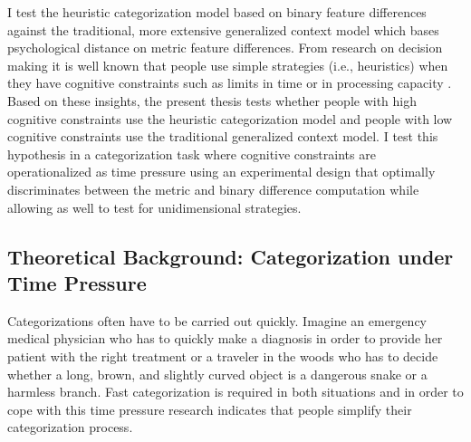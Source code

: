 \documentclass[a4paper,man,natbib]{apa6}
\begin{document}
I test the heuristic categorization model based on binary feature differences against the traditional, more extensive generalized context model \citep{nosofsky1986attention} which bases psychological distance on metric feature differences. From research on decision making it is well known that people use simple strategies (i.e., heuristics) when they have cognitive constraints such as limits in time or in processing capacity \citep{gigerenzer1996reasoning, finucane2000affect, kahneman2003perspective, gilovich2002heuristics, simon1957models, simon1955behavioral}. Based on these insights, the present thesis tests whether people with high cognitive constraints use the heuristic categorization model and people with low cognitive constraints use the traditional generalized context model. I test this hypothesis in a categorization task where cognitive constraints are operationalized as time pressure using an experimental design that optimally discriminates between the metric and binary difference computation while allowing as well to test for unidimensional strategies. 


\subsection{Theoretical Background: Categorization under Time Pressure}
Categorizations often have to be carried out quickly. Imagine an emergency medical physician who has to quickly make a diagnosis in order to provide her patient with the right treatment or a traveler in the woods who has to decide whether a long, brown, and slightly curved object is a dangerous snake or a harmless branch. Fast categorization is required in both situations and in order to cope with this time pressure research indicates that people simplify their categorization process. 
\end{document}
